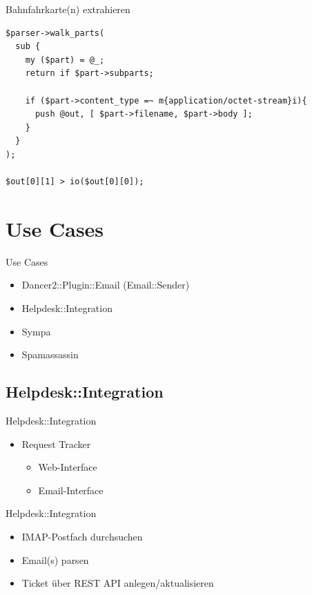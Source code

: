 \begin{frame}[fragile]{Bahnfahrkarte(n) extrahieren}
\begin{verbatim}
$parser->walk_parts(
  sub {
    my ($part) = @_;
    return if $part->subparts;

    if ($part->content_type =~ m{application/octet-stream}i){
      push @out, [ $part->filename, $part->body ];
    }
  }
);

$out[0][1] > io($out[0][0]);
\end{verbatim}
\end{frame}

\section{Use Cases}

\begin{frame}{Use Cases}
  \begin{itemize}
  \item Dancer2::Plugin::Email (Email::Sender)
  \item Helpdesk::Integration
  \item Sympa
  \item Spamassassin
  \end{itemize}
\end{frame}

\subsection{Helpdesk::Integration}

\begin{frame}{Helpdesk::Integration}
  \begin{itemize}
  \item Request Tracker
    \begin{itemize}
    \item Web-Interface
    \item Email-Interface
    \end{itemize}
  \end{itemize}
\end{frame}

\begin{frame}{Helpdesk::Integration}
  \begin{itemize}
  \item IMAP-Postfach durchsuchen
  \item Email(s) parsen
  \item Ticket über REST API anlegen/aktualisieren
  \end{itemize}
\end{frame}

